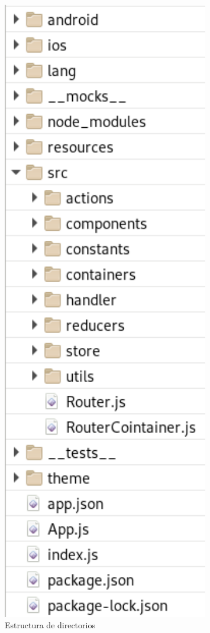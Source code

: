 \begin{figure}[!h]
	\begin{center}
		\includegraphics[width=0.8\textwidth]{./img/resultados/estructura.png}
		\caption{Estructura de directorios}
		\label{fig:estructura}
	\end{center}
\end{figure}

